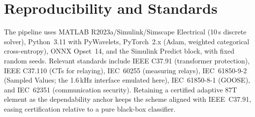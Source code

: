 \documentclass[12pt,a4paper,oneside]{report}
\begin{document}
\chapter{Reproducibility and Standards}
The pipeline uses MATLAB R2023a/Simulink/Simscape Electrical (10\,\textmu s discrete solver), Python~3.11 with PyWavelets, PyTorch~2.x (Adam, weighted categorical cross-entropy), ONNX Opset~14, and the Simulink Predict block, with fixed random seeds. Relevant standards include IEEE C37.91 (transformer protection), IEEE C37.110 (CTs for relaying), IEC~60255 (measuring relays), IEC~61850-9-2 (Sampled Values; the 1.6\,kHz interface emulated here), IEC~61850-8-1 (GOOSE), and IEC~62351 (communication security). Retaining a certified adaptive 87T element as the dependability anchor keeps the scheme aligned with IEEE~C37.91, easing certification relative to a pure black-box classifier.
\end{document}
